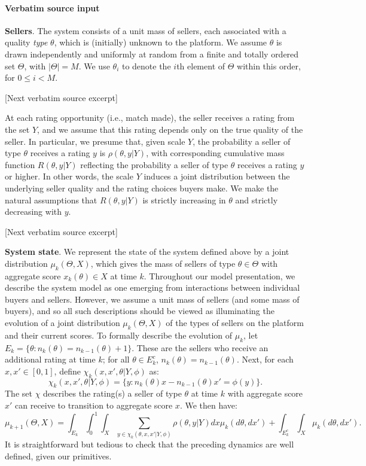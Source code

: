 \documentclass[10pt]{article}
\begin{document}
\paragraph{Verbatim source input}
\begin{ReviewVerbatim}
{\bf Sellers}.  The system consists of a unit mass of sellers, each associated with a quality \textit{type} $\theta$, which is (initially) unknown to the platform. We assume $\theta$ is drawn independently and uniformly at random from a finite and totally ordered set $\Theta$, with $|\Theta| = M$. We use $\theta_i$ to denote the $i$th element of $\Theta$ within this order, for $0\leq i < M$.

[Next verbatim source excerpt]

At each rating opportunity (i.e., match made), the seller receives a rating from the set $Y$, and we assume that this rating depends only on the true quality of the seller. In particular, we presume that, given scale $Y$, the probability a seller of type $\theta$ receives a rating $y$ is $\rho(\theta, y | Y)$, with corresponding cumulative mass function $R(\theta,y| Y)$ reflecting the probability a seller of type $\theta$ receives a rating $y$ or higher. In other words, the scale $Y$ induces a joint distribution between the underlying seller quality and the rating choices buyers make. We make the natural assumptions that $R(\theta,y| Y)$ is strictly increasing in $\theta$ and strictly decreasing with $y$.

[Next verbatim source excerpt]

{\bf System state}.  We represent the state of the system defined above by a joint distribution $\mu_k(\Theta, X)$, which gives the mass of sellers of type $\theta \in \Theta$ with aggregate score $x_k(\theta) \in X$ at time $k$. Throughout our model presentation, we describe the system model as one emerging from interactions between individual buyers and sellers. However, we assume a unit mass of sellers (and some mass of buyers), and so all such descriptions should be viewed as illuminating the evolution of a joint distribution $\mu_k (\Theta, X)$ of the types of sellers on the platform and their current scores. To formally describe the evolution of $\mu_k$, let $E_k = \{ \theta : n_k(\theta) = n_{k-1}(\theta) + 1 \}$.  These are the sellers who receive an additional rating at time $k$; for all $\theta \in E_k^c$, $n_k(\theta) = n_{k-1}(\theta)$.  Next, for each $x, x' \in [0,1]$, define $\chi_k(x, x',\theta | Y, {\phi})$ as:
\[
{\chi_k(x, x',\theta | Y, \phi) =} \{ y : n_k(\theta)x - n_{k-1}(\theta)x' = \phi(y) \}.
\]
The set $\chi$ describes the rating(s) a seller of type $\theta$ at time $k$ with aggregate score $x'$ can receive to transition to aggregate score $x$.  We then have:
\[ \mu_{k+1}(\Theta, X) = \int_{E_k} \int_0^1 \int_X \sum_{y \in \chi_k(\theta, x, x' | Y, \phi)} \rho(\theta, y | Y)  dx \mu_k(d\theta, dx') + \int_{E_k^c} \int_X \mu_k(d\theta, dx'). \]
It is straightforward but tedious to check that the preceding dynamics are well defined, given our primitives.



\end{ReviewVerbatim}
\end{document}
